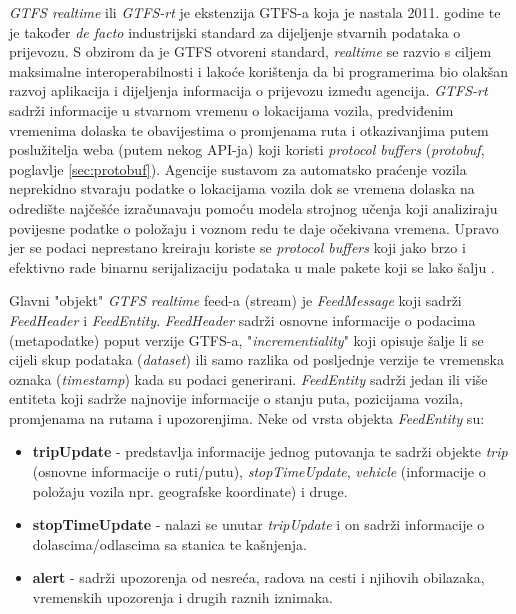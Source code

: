 \documentclass[zavrsnirad]{fer}
\begin{document}
\textit{GTFS realtime} ili \textit{GTFS-rt} je ekstenzija GTFS-a koja je nastala 2011. godine te je također \textit{de facto}
industrijski standard za dijeljenje stvarnih podataka o prijevozu. S obzirom da je GTFS otvoreni standard,
\textit{realtime} se razvio s ciljem maksimalne interoperabilnosti i lakoće korištenja da bi programerima bio olakšan razvoj aplikacija i dijeljenja informacija o prijevozu između agencija. \textit{GTFS-rt}
sadrži informacije u stvarnom vremenu o lokacijama vozila, predviđenim vremenima dolaska te
obavijestima o promjenama ruta i otkazivanjima putem poslužitelja weba (putem nekog API-ja) koji koristi \textit{protocol buffers} (\textit{protobuf}, poglavlje \ref{sec:protobuf}). Agencije sustavom za automatsko praćenje vozila neprekidno stvaraju podatke o lokacijama vozila dok se vremena dolaska na odredište najčešće izračunavaju pomoću modela strojnog učenja koji analiziraju povijesne podatke o položaju i voznom redu te daje očekivana vremena. Upravo jer se podaci neprestano kreiraju koriste se \textit{protocol buffers} koji jako brzo i efektivno rade binarnu serijalizaciju podataka u male pakete koji se lako šalju \cite{GTFS-realtime}.

Glavni "objekt" \textit{GTFS realtime} feed-a (stream) je \textit{FeedMessage} koji sadrži \textit{FeedHeader} i \textit{FeedEntity}.
\textit{FeedHeader} sadrži osnovne informacije o podacima (metapodatke) poput verzije GTFS-a, "\textit{incrementiality}" koji opisuje šalje li se cijeli skup podataka (\textit{dataset}) ili samo razlika od posljednje verzije te vremenska oznaka (\textit{timestamp}) kada su podaci generirani.
\textit{FeedEntity} sadrži jedan ili više entiteta koji sadrže najnovije informacije o stanju puta, pozicijama vozila, promjenama na rutama i upozorenjima. Neke od vrsta objekta \textit{FeedEntity} su: 

\begin{itemize}
	\item \textbf{tripUpdate} - predstavlja informacije jednog putovanja te sadrži objekte \textit{trip} (osnovne informacije o ruti/putu), \textit{stopTimeUpdate}, \textit{vehicle} (informacije o položaju vozila npr. geografske koordinate) i druge.
	\item \textbf{stopTimeUpdate} - nalazi se unutar \textit{tripUpdate} i on sadrži informacije o dolascima/odlascima sa stanica te kašnjenja.
	\item \textbf{alert} - sadrži upozorenja od nesreća, radova na cesti i njihovih obilazaka, vremenskih upozorenja i drugih raznih iznimaka.
\end{itemize}
\end{document}
